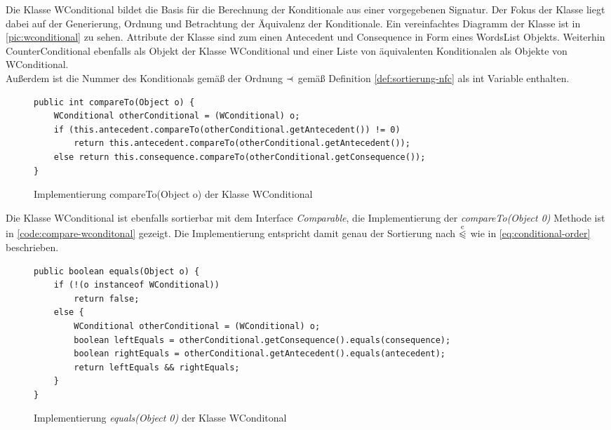 \documentclass[12pt,a4paper]{article}
\newcommand\dotll{\mathrel{%
    \mathchoice{\QEQQ}{\QEQQ}{\QEQQ}{\QEQQ}%
}}
\def\QEQQ{{%
    \setbox0\hbox{$\leqslant$}%
    \rlap{\hbox to \wd0{\hss \raisebox {1pt}{$\ \cdot$\hss}}}\box0
}}
\newcommand\rdotl{\mathrel{%
    \mathchoice{\RQEQ}{\RQEQ}{\RQEQ}{\RQEQ}%
}}
\def\RQEQ{{%
    \setbox0\hbox{$\prec$}%
    \rlap{\hbox to \wd0{\hss \raisebox {0.01pt}{$\ \cdot$\hss}}}\box0
}}
\begin{document}
Die Klasse WConditional bildet die Basis für die Berechnung der Konditionale aus einer vorgegebenen Signatur. Der Fokus der Klasse liegt dabei auf der Generierung, Ordnung und Betrachtung der Äquivalenz der Konditionale. Ein vereinfachtes Diagramm der Klasse ist in \autoref{pic:wconditional} zu sehen. Attribute der Klasse sind zum einen Antecedent und Consequence in Form eines WordsList Objekts. Weiterhin CounterConditional ebenfalls als Objekt der Klasse WConditional und einer Liste von äquivalenten Konditionalen als Objekte von WConditional.\\
Außerdem ist die Nummer des Konditionals gemäß der Ordnung $\rdotl$ gemäß Definition \ref{def:sortierung-nfc} als int Variable enthalten.



\begin{figure}
\begin{lstlisting}
public int compareTo(Object o) {
    WConditional otherConditional = (WConditional) o;
    if (this.antecedent.compareTo(otherConditional.getAntecedent()) != 0)
        return this.antecedent.compareTo(otherConditional.getAntecedent());
    else return this.consequence.compareTo(otherConditional.getConsequence());
}
\end{lstlisting}
\caption{Implementierung compareTo(Object o) der Klasse WConditional}
\label{code:compare-wconditonal}
\end{figure}


Die Klasse WConditional ist ebenfalls sortierbar mit dem Interface \textit{Comparable}, die Implementierung der \textit{compareTo(Object 0)} Methode ist in \autoref{code:compare-wconditonal} gezeigt. Die Implementierung entspricht damit genau der Sortierung nach $\overset{\mathrm{c}}{\dotll}$ wie in \autoref{eq:conditional-order} beschrieben.



\begin{figure}
\begin{lstlisting}
public boolean equals(Object o) {
    if (!(o instanceof WConditional))
        return false;
    else {
        WConditional otherConditional = (WConditional) o;
        boolean leftEquals = otherConditional.getConsequence().equals(consequence);
        boolean rightEquals = otherConditional.getAntecedent().equals(antecedent);
        return leftEquals && rightEquals;
    }
}
\end{lstlisting}
\caption{Implementierung \textit{equals(Object 0)} der Klasse WConditonal}
\label{code:equals-wconditonal}
\end{figure}
\end{document}
